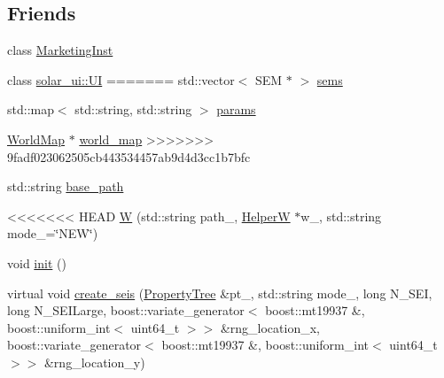 \subsection*{Friends}
\begin{DoxyCompactItemize}
\item 
class \hyperlink{classsolar__core_1_1_w_ac01e54f17f927af30196b551d235d7ba}{Marketing\+Inst}
\item 
class \hyperlink{classsolar__core_1_1_w_a8f3690c82c493af3a66f999410fe891d}{solar\+\_\+ui\+::\+U\+I}
=======
std\+::vector$<$ S\+E\+M $\ast$ $>$ \hyperlink{classsolar__core_1_1_w_ab6349cbc751747a05618dad4ebb1b726}{sems}
\item 
std\+::map$<$ std\+::string, std\+::string $>$ \hyperlink{classsolar__core_1_1_w_a0d06bc7242f8b3958986118eb217583f}{params}
\item 
\hyperlink{classsolar__core_1_1_world_map}{World\+Map} $\ast$ \hyperlink{classsolar__core_1_1_w_a8ed6f1aa7fd4ef2c3488147b38a670b7}{world\+\_\+map}
>>>>>>> 9fadf023062505cb443534457ab9d4d3cc1b7bfc
\end{DoxyCompactItemize}
\begin{DoxyCompactItemize}
\item 
std\+::string \hyperlink{classsolar__core_1_1_w_acf6e7dd195573ba04b406cde2e5b80fb}{base\+\_\+path}
\item 
<<<<<<< HEAD
\hyperlink{classsolar__core_1_1_w_a969ad4de57020878a91873868c9bdb45}{W} (std\+::string path\+\_\+, \hyperlink{classsolar__core_1_1_helper_w}{Helper\+W} $\ast$w\+\_\+, std\+::string mode\+\_\+=\char`\"{}N\+E\+W\char`\"{})
\item 
void \hyperlink{classsolar__core_1_1_w_af58a19a39fb9fb34258803c613924613}{init} ()
\item 
virtual void \hyperlink{classsolar__core_1_1_w_a0b92657c681579dacc29821f41650541}{create\+\_\+seis} (\hyperlink{namespacesolar__core_adeda2737d6938c190eb774a5b2495045}{Property\+Tree} \&pt\+\_\+, std\+::string mode\+\_\+, long N\+\_\+\+S\+E\+I, long N\+\_\+\+S\+E\+I\+Large, boost\+::variate\+\_\+generator$<$ boost\+::mt19937 \&, boost\+::uniform\+\_\+int$<$ uint64\+\_\+t $>$$>$ \&rng\+\_\+location\+\_\+x, boost\+::variate\+\_\+generator$<$ boost\+::mt19937 \&, boost\+::uniform\+\_\+int$<$ uint64\+\_\+t $>$$>$ \&rng\+\_\+location\+\_\+y)
\end{DoxyCompactItemize}
